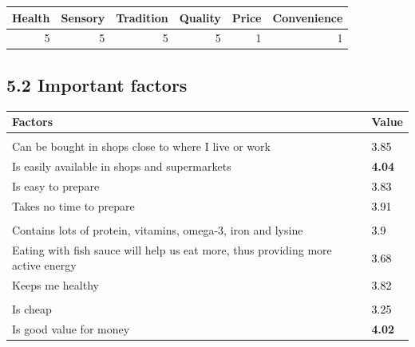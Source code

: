 \documentclass[]{article}
\begin{document}
\begin{tabular}{rrrrrr}
\toprule
\textbf{Health} & \textbf{Sensory} & \textbf{Tradition} & \textbf{Quality} & \textbf{Price} & \textbf{Convenience}\\
\midrule
5 & 5 & 5 & 5 & 1 & 1\\
\bottomrule
\end{tabular}

\hypertarget{important-factors}{%
\subsection{5.2 Important factors}\label{important-factors}}

\begin{tabular}{ll}
\toprule
\textbf{Factors} & \textbf{Value}\\
\midrule
\addlinespace[0.3em]
\multicolumn{2}{l}{\textbf{Convenience}}\\
\hspace{1em}Can be bought in shops close to where I live or work & \textcolor{black}{3.85}\\
\hspace{1em}Is easily available in shops and supermarkets & \textcolor[HTML]{1e90ff}{\textbf{4.04}}\\
\hspace{1em}Is easy to prepare & \textcolor{black}{3.83}\\
\hspace{1em}Takes no time to prepare & \textcolor{black}{3.91}\\
\addlinespace[0.3em]
\multicolumn{2}{l}{\textbf{Health}}\\
\hspace{1em}Contains lots of protein, vitamins, omega-3, iron and lysine & \textcolor{black}{3.9}\\
\hspace{1em}Eating with fish sauce will help us eat more, thus providing more active energy & \textcolor{black}{3.68}\\
\hspace{1em}Keeps me healthy & \textcolor{black}{3.82}\\
\addlinespace[0.3em]
\multicolumn{2}{l}{\textbf{Price}}\\
\hspace{1em}Is cheap & \textcolor{black}{3.25}\\
\hspace{1em}Is good value for money & \textcolor[HTML]{1e90ff}{\textbf{4.02}}\\

\end{tabular}
\end{document}
